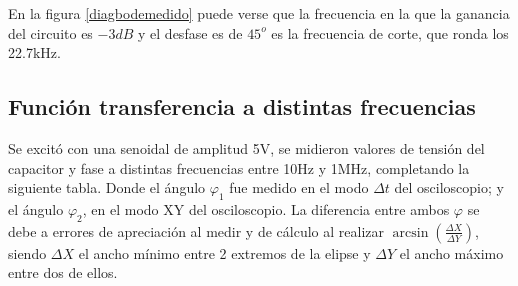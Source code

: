 En la figura \ref{diagbodemedido} puede verse que la frecuencia en la que la ganancia del circuito es $-3dB$ y el desfase es de $45^o$ es la frecuencia de corte, que ronda los 22.7kHz.

\subsection{Función transferencia a distintas frecuencias}

Se excitó con una senoidal de amplitud 5V, se midieron valores de tensión del capacitor y fase a distintas frecuencias entre 10Hz y 1MHz, completando la siguiente tabla. Donde el ángulo $\varphi_1$ fue medido en el modo $\Delta t$ del osciloscopio; y el ángulo $\varphi_2$, en el modo XY del osciloscopio.
La diferencia entre ambos $\varphi$ se debe a errores de apreciación al medir y de cálculo al realizar $\arcsin(\frac{\Delta X}{\Delta Y})$, siendo $\Delta X$ el ancho mínimo entre 2 extremos de la elipse y $\Delta Y$ el ancho máximo entre dos de ellos. 


